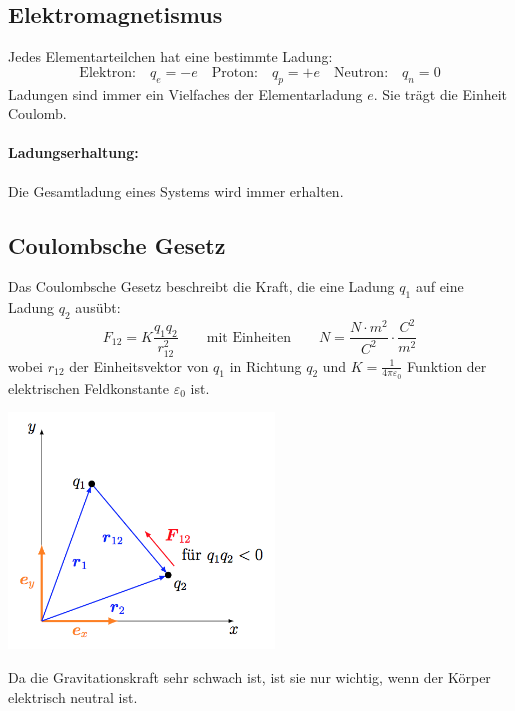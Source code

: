 \documentclass[11pt]{article}
\begin{document}
\subsection{Elektromagnetismus}

Jedes Elementarteilchen hat eine bestimmte Ladung:
\begin{equation*}
	\text{Elektron:}\quad q_e = -e \quad\text{Proton:}\quad q_p = +e \quad\text{Neutron:}\quad q_n = 0
\end{equation*}
Ladungen sind immer ein Vielfaches der Elementarladung $e$. Sie tr{\"a}gt die Einheit Coulomb. 

\paragraph{Ladungserhaltung:} Die Gesamtladung eines Systems wird immer erhalten.

\subsection{Coulombsche Gesetz}

Das Coulombsche Gesetz beschreibt die Kraft, die eine Ladung $q_1$ auf eine Ladung $q_2$ aus{\"u}bt:
\begin{equation*}
	F_{12} = K\frac{q_1 q_2}{r_{12}^2} \qquad\text{mit Einheiten}\qquad N = \frac{N\cdot m^2}{C^2}\cdot\frac{C^2}{m^2}
\end{equation*}
wobei $r_{12}$ der Einheitsvektor von $q_1$ in Richtung $q_2$ und $K = \frac{1}{4\pi\varepsilon_0}$ Funktion der elektrischen Feldkonstante $\varepsilon_0$ ist.

\begin{center}
	\includegraphics[width=200pt]{images/coulomb}
\end{center}

Da die Gravitationskraft sehr schwach ist, ist sie nur wichtig, wenn der K{\"o}rper elektrisch neutral ist.
\end{document}
